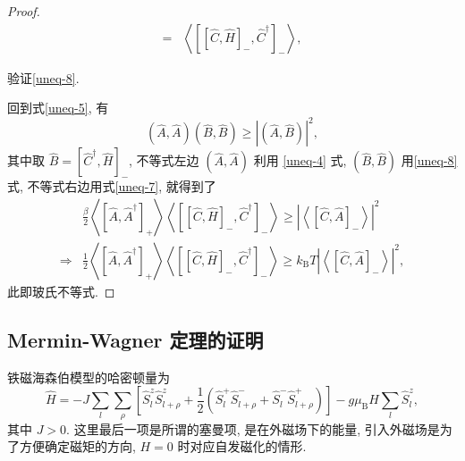 \begin{proof}
\begin{align}
            =&\left\langle \left[ \left[ \hat{C},\hat{H} \right]_-,\hat{C}^\dagger \right]_- \right\rangle,
        \end{align}
    \begin{question}{}{}
        验证\eqref{uneq-8}.
    \end{question}
    回到式\eqref{uneq-5}, 有
    \begin{equation}
        \left( \hat{A},\hat{A} \right)\left( \hat{B},\hat{B} \right)\ge \left| \left( \hat{A},\hat{B} \right) \right|^2,
    \end{equation}
    其中取 $\hat{B}=[\hat{C}^\dagger,\hat{H}]_-$, 不等式左边 $(\hat{A},\hat{A})$ 利用 \eqref{uneq-4} 式, $(\hat{B},\hat{B})$ 用\eqref{uneq-8}式, 不等式右边用式\eqref{uneq-7}, 就得到了
      \begin{align}
            &\frac{\beta}{2}\left\langle \left[\hat{A},\hat{A}^\dagger\right]_+ \right\rangle\left\langle \left[ [\hat{C},\hat{H}]_-,\hat{C}^\dagger \right]_- \right\rangle\ge \left| \left\langle \left[ \hat{C},\hat{A} \right]_- \right\rangle \right|^2\nonumber\\
            \Rightarrow &\frac{1}{2}\left\langle \left[ \hat{A},\hat{A}^\dagger \right]_+ \right\rangle\left\langle \left[ [\hat{C},\hat{H}]_-,\hat{C}^\dagger \right]_- \right\rangle\ge k_{\mathrm{B}}T\left| \left\langle\left[ \hat{C},\hat{A} \right]_-\right\rangle \right|^2,
        \end{align}
    此即玻氏不等式.
\end{proof}

\subsection{Mermin-Wagner 定理的证明}
铁磁海森伯模型的哈密顿量为
\begin{equation}
\hat{H}=-J \sum_{l} \sum_{\rho}\left[\hat{S}_{l}^{z} \hat{S}_{l+\rho}^{z}+\frac{1}{2}\left(\hat{S}_{l}^{+} \hat{S}_{l+\rho}^{-}+\hat{S}_{l}^{-} \hat{S}_{l+\rho}^{+}\right)\right]-g \mu_{\mathrm{B}} H \sum_{l} \hat{S}_{l}^{z} ,
\end{equation}
其中 $J>0$. 这里最后一项是所谓的塞曼项, 是在外磁场下的能量, 引入外磁场是为了方便确定磁矩的方向, $H=0$ 时对应自发磁化的情形.

